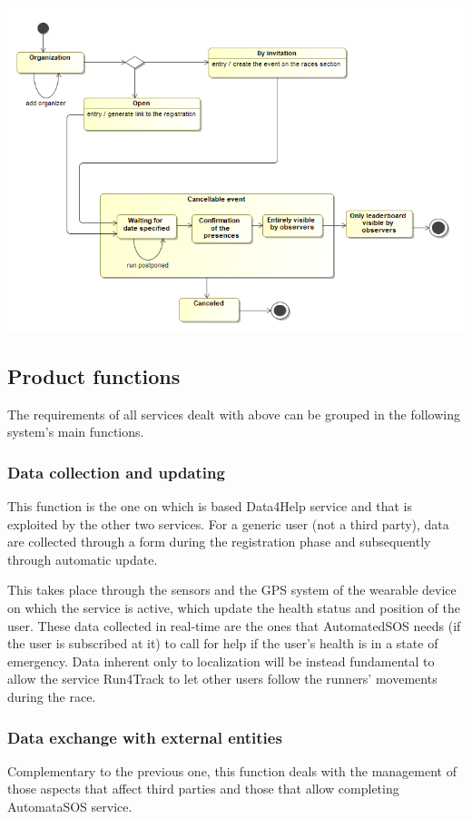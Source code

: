 \begin{center}
\includegraphics[scale=0.6]{sections/diagrams/stateDiagram.png}
\end{center}

\subsection{Product functions}
The requirements of all services dealt with above can be grouped in the following system's main functions.

\subsubsection{Data collection and updating}
This function is the one on which is based Data4Help service and that is exploited by the other two services. For a generic user (not a third party), data are collected through a form during the registration phase and subsequently through automatic update.

This takes place through the sensors and the GPS system of the wearable device on which the service is active, which update the health status and position of the user. These data collected in real-time are the ones that AutomatedSOS needs (if the user is subscribed at it) to call for help if the user's health is in a state of emergency. Data inherent only to localization will be instead fundamental to allow the service Run4Track to let other users follow the runners' movements during the race.

\subsubsection{Data exchange with external entities}
Complementary to the previous one, this function deals with the management of those aspects that affect third parties and those that allow completing AutomataSOS service.

